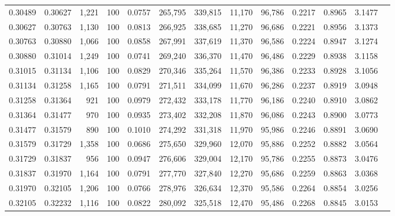 \begin{tabular}{rrrrrrrrrrrrr}
0.30489 & 0.30627 & 1,221 & 100 &                                     0.0757 & 265,795 & 339,815 &  11,170 &  96,786 & 0.2217 & 0.8965 & 3.1477 \\
0.30627 & 0.30763 & 1,130 & 100 &                                     0.0813 & 266,925 & 338,685 &  11,270 &  96,686 & 0.2221 & 0.8956 & 3.1373 \\
0.30763 & 0.30880 & 1,066 & 100 &                                     0.0858 & 267,991 & 337,619 &  11,370 &  96,586 & 0.2224 & 0.8947 & 3.1274 \\
0.30880 & 0.31014 & 1,249 & 100 &                                     0.0741 & 269,240 & 336,370 &  11,470 &  96,486 & 0.2229 & 0.8938 & 3.1158 \\
0.31015 & 0.31134 & 1,106 & 100 &                                     0.0829 & 270,346 & 335,264 &  11,570 &  96,386 & 0.2233 & 0.8928 & 3.1056 \\
0.31134 & 0.31258 & 1,165 & 100 &                                     0.0791 & 271,511 & 334,099 &  11,670 &  96,286 & 0.2237 & 0.8919 & 3.0948 \\
0.31258 & 0.31364 &   921 & 100 &                                     0.0979 & 272,432 & 333,178 &  11,770 &  96,186 & 0.2240 & 0.8910 & 3.0862 \\
0.31364 & 0.31477 &   970 & 100 &                                     0.0935 & 273,402 & 332,208 &  11,870 &  96,086 & 0.2243 & 0.8900 & 3.0773 \\
0.31477 & 0.31579 &   890 & 100 &                                     0.1010 & 274,292 & 331,318 &  11,970 &  95,986 & 0.2246 & 0.8891 & 3.0690 \\
0.31579 & 0.31729 & 1,358 & 100 &                                     0.0686 & 275,650 & 329,960 &  12,070 &  95,886 & 0.2252 & 0.8882 & 3.0564 \\
0.31729 & 0.31837 &   956 & 100 &                                     0.0947 & 276,606 & 329,004 &  12,170 &  95,786 & 0.2255 & 0.8873 & 3.0476 \\
0.31837 & 0.31970 & 1,164 & 100 &                                     0.0791 & 277,770 & 327,840 &  12,270 &  95,686 & 0.2259 & 0.8863 & 3.0368 \\
0.31970 & 0.32105 & 1,206 & 100 &                                     0.0766 & 278,976 & 326,634 &  12,370 &  95,586 & 0.2264 & 0.8854 & 3.0256 \\
0.32105 & 0.32232 & 1,116 & 100 &                                     0.0822 & 280,092 & 325,518 &  12,470 &  95,486 & 0.2268 & 0.8845 & 3.0153 \\

\end{tabular}
